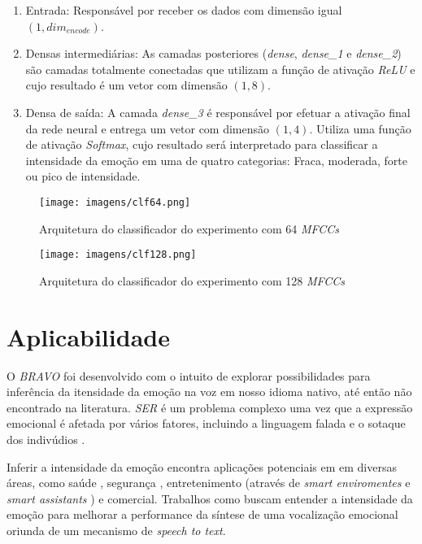 \begin{enumerate}
    \item Entrada: Responsável por receber os dados com dimensão igual $(1, dim_{encode})$.
    \item Densas intermediárias: As camadas posteriores (\textit{dense}, \textit{dense\_1} e \textit{dense\_2}) são camadas totalmente conectadas que utilizam a função de ativação \textit{ReLU} e cujo resultado é um vetor com dimensão $(1, 8)$.
    \item Densa de saída: A camada \textit{dense\_3} é responsável por efetuar a ativação final da rede neural e entrega um vetor com dimensão $(1, 4)$. Utiliza uma função de ativação \textit{Softmax}, cujo resultado será interpretado para classificar a intensidade da emoção em uma de quatro categorias: Fraca, moderada, forte ou pico de intensidade.
\end{enumerate}

\begin{figure}[h]
    \centering
    \begin{minipage}[b]{0.45\linewidth}
        \centering
        \texttt{[image: imagens/clf64.png]}
        \caption{\label{fig:clf64}Arquitetura do classificador do experimento com 64 \textit{MFCCs}}
    \end{minipage}
    \begin{minipage}[b]{0.45\linewidth}
    \centering
        \texttt{[image: imagens/clf128.png]}
        \caption{\label{fig:clf128}Arquitetura do classificador do experimento com 128 \textit{MFCCs}}
    \end{minipage}
\end{figure}

\section{Aplicabilidade}\label{sec:aplicabilidade}

O \textit{BRAVO} foi desenvolvido com o intuito de explorar possibilidades para inferência da itensidade da emoção na voz em nosso idioma nativo, até então não encontrado na literatura. \textit{SER} é um problema complexo uma vez que a expressão emocional é afetada por vários fatores, incluindo a linguagem falada e o sotaque dos indivúdios \cite{6}.

Inferir a intensidade da emoção encontra aplicações potenciais em em diversas áreas, como saúde \cite{1}, segurança \cite{4}, entretenimento (através de \textit{smart enviromentes} \cite{alexa1} e \textit{smart assistants} \cite{alexa2}) e comercial\cite{bsignal1}\cite{bsignal2}. Trabalhos como \cite{63} buscam entender a intensidade da emoção para melhorar a performance da síntese de uma vocalização emocional oriunda de um mecanismo de \textit{speech to text}.

